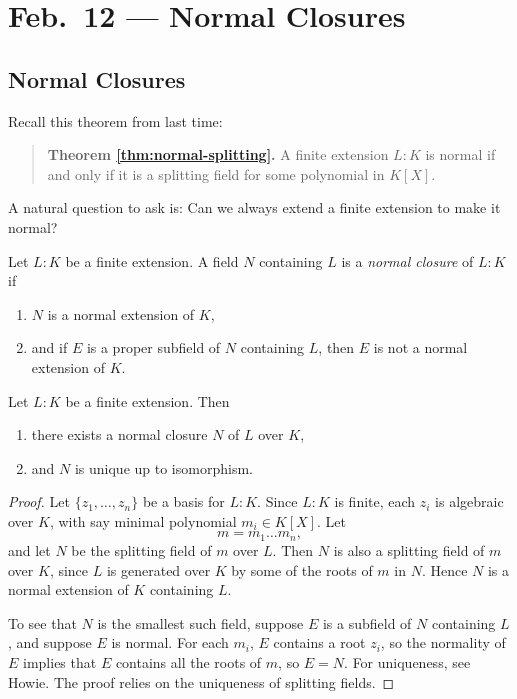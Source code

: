 \chapter{Feb.~12 --- Normal Closures}

\section{Normal Closures}

Recall this theorem from last time:
\begin{quote}
  \textbf{Theorem \ref{thm:normal-splitting}.}
  A finite extension $L : K$ is normal if and only
  if it is a splitting field for some polynomial
  in $K[X]$.
\end{quote}
A natural question to ask is: Can we always extend
a finite extension to make it normal?

\begin{definition}
  Let $L : K$ be a finite extension. A field $N$
  containing $L$ is a \emph{normal closure} of $L : K$ if
  \begin{enumerate}
    \item $N$ is a normal extension of $K$,
    \item and if $E$ is a proper subfield of $N$
      containing $L$, then $E$ is not a normal
      extension of $K$.
  \end{enumerate}
\end{definition}

\begin{theorem}
  Let $L : K$ be a finite extension. Then
  \begin{enumerate}
    \item there exists a normal closure $N$ of $L$
      over $K$,
    \item and $N$ is unique up to isomorphism.
  \end{enumerate}
\end{theorem}

\begin{proof}
  Let $\{z_1, \dots, z_n\}$ be a basis for $L : K$. Since
  $L : K$ is finite, each $z_i$ is algebraic over $K$,
  with say minimal polynomial $m_i \in K[X]$. Let
  \[
    m = m_1 \dots m_n,
  \]
  and let $N$ be the splitting field of $m$ over $L$.
  Then $N$ is also a splitting field of $m$ over $K$,
  since $L$ is generated over $K$ by some of
  the roots of $m$ in $N$. Hence $N$ is a normal
  extension of $K$ containing $L$.

  To see that $N$ is the smallest such field, suppose
  $E$ is a subfield of $N$ containing $L$, and suppose
  $E$ is normal. For each $m_i$, $E$ contains a root
  $z_i$, so the normality of $E$ implies that $E$ contains
  all the roots of $m$, so $E = N$. For uniqueness,
  see Howie. The proof relies on the uniqueness of
  splitting fields.
\end{proof}

